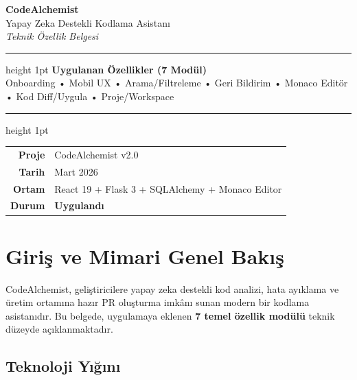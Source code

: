 \documentclass[12pt,a4paper]{article}
\begin{document}
\begin{titlepage}
  \centering
  \vspace*{2cm}
  {\Huge\bfseries\color{fuchsia} CodeAlchemist}\\[0.5em]
  {\Large\color{gray} Yapay Zeka Destekli Kodlama Asistanı}\\[0.3em]
  {\large\itshape Teknik Özellik Belgesi}\\[2cm]

  \hrule height 1pt
  \vspace{0.4cm}
  {\large\bfseries Uygulanan Özellikler (7 Modül)}\\
  {\small Onboarding • Mobil UX • Arama/Filtreleme • Geri Bildirim •
  Monaco Editör • Kod Diff/Uygula • Proje/Workspace}
  \vspace{0.4cm}
  \hrule height 1pt

  \vspace{2cm}
  \begin{tabular}{rl}
    \textbf{Proje}  & CodeAlchemist v2.0 \\
    \textbf{Tarih}  & Mart 2026 \\
    \textbf{Ortam}  & React 19 + Flask 3 + SQLAlchemy + Monaco Editor \\
    \textbf{Durum}  & \textcolor{green!60!black}{\bfseries Uygulandı}
  \end{tabular}
\end{titlepage}

\tableofcontents
\newpage

\section{Giriş ve Mimari Genel Bakış}

CodeAlchemist, geliştiricilere yapay zeka destekli kod analizi, hata ayıklama ve üretim ortamına hazır PR oluşturma imkânı sunan modern bir kodlama asistanıdır. Bu belgede, uygulamaya eklenen \textbf{7 temel özellik modülü} teknik düzeyde açıklanmaktadır.

\subsection{Teknoloji Yığını}
\end{document}
